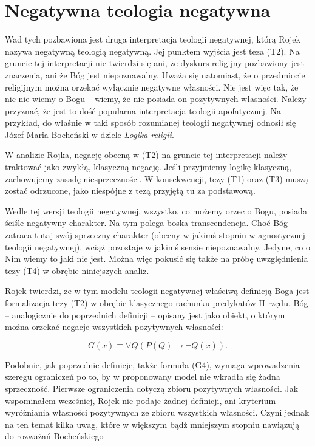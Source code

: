 \section{Negatywna teologia negatywna}

Wad tych pozbawiona jest druga interpretacja teologii negatywnej, którą
Rojek nazywa negatywną teologią negatywną. Jej punktem wyjścia jest
teza (T2). Na gruncie tej interpretacji nie twierdzi się ani, że
dyskurs religijny pozbawiony jest znaczenia, ani że Bóg jest
niepoznawalny. Uważa się natomiast, że o przedmiocie religijnym można
orzekać wyłącznie negatywne własności. Nie jest więc tak, że nic nie
wiemy o Bogu -- wiemy, że nie posiada on pozytywnych własności. Należy
przyznać, że jest to dość popularna interpretacja teologii
apofatycznej. Na przykład, do właśnie w taki sposób rozumianej teologii
negatywnej odnosił się Józef Maria Bocheński w dziele \textit{Logika
religii}.

W analizie Rojka, negację obecną w (T2) na gruncie tej interpretacji
należy traktować jako zwykłą, klasyczną negację. Jeśli przyjmiemy
logikę klasyczną, zachowujemy zasadę niesprzeczności. W konsekwencji,
tezy (T1) oraz (T3) muszą zostać odrzucone, jako niespójne z tezą
przyjętą tu za podstawową.

Wedle tej wersji teologii negatywnej, wszystko, co możemy orzec o Bogu,
posiada ściśle negatywny charakter. Na tym polega boska transcendencja.
Choć Bóg zatraca tutaj swój sprzeczny charakter (obecny w jakimś
stopniu w agnostycznej teologii negatywnej), wciąż pozostaje w jakimś
sensie niepoznawalny. Jedyne, co o Nim wiemy to jaki nie jest. Można
więc pokusić się także na próbę uwzględnienia tezy (T4) w obrębie
niniejszych analiz.

Rojek twierdzi, że w tym modelu teologii negatywnej właściwą definicją
Boga jest formalizacja tezy (T2) w obrębie klasycznego rachunku
predykatów II-rzędu. Bóg -- analogicznie do poprzednich definicji –
opisany jest jako obiekt, o którym można orzekać negacje wszystkich
pozytywnych własności:


\begin{equation}\label{G4}\tag{G4}
    G(x) \equiv  \forall Q (P(Q) \to
\neg Q(x)).
\end{equation}





Podobnie, jak poprzednie definicje, także formuła (G4), wymaga
wprowadzenia szeregu ograniczeń po to, by w proponowany model nie
wkradła się żadna sprzeczność. Pierwsze ograniczenia dotyczą zbioru
pozytywnych własności. Jak wspominałem wcześniej, Rojek nie podaje
żadnej definicji, ani kryterium wyróżniania własności pozytywnych ze
zbioru wszystkich własności. Czyni jednak na ten temat kilka uwag,
które w większym bądź mniejszym stopniu nawiązują do rozważań
Bocheńskiego

